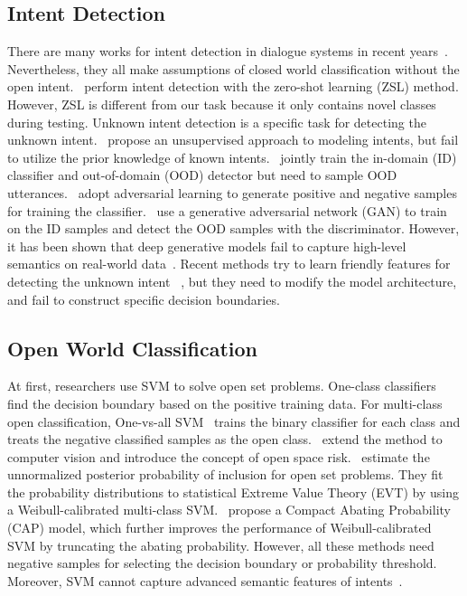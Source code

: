 \documentclass[letterpaper]{article} %
\begin{document}
\subsection{Intent Detection}
There are many works for intent detection in dialogue systems in recent years~\cite{ijcai2020-532,Qin_Che_Li_Ni_Liu_2020,zhang-etal-2019-joint,e-etal-2019-novel,qin-etal-2019-stack}. Nevertheless, they all make assumptions of closed world classification without the open intent.~\citet{srivastava-etal-2018-zero} perform intent detection with the zero-shot learning (ZSL) method. However, ZSL is different from our task because it only contains novel classes during testing.  Unknown intent detection is a specific task for detecting the unknown intent.~\citet{Brychcin2017UnsupervisedDA} propose an unsupervised approach to modeling intents,  but fail to utilize the prior knowledge of known intents.~\citet{Kim2018JointLO} jointly train the in-domain (ID) classifier and out-of-domain (OOD) detector but need to sample OOD utterances.~\citet{Yu2017OpenCategoryCB} adopt adversarial learning to generate positive and negative samples for training the classifier.~\citet{ryu-etal-2018-domain} use a generative adversarial network (GAN) to train on the ID samples and detect the OOD samples with the discriminator. However, it has been shown that deep generative models fail to capture high-level semantics on real-world data~\cite{2018arXiv181009136N,Mundt_2019_ICCV}. Recent methods try to learn friendly features for detecting the unknown intent ~\cite{lin-xu-2019-deep,gangal2020likelihood,yan-etal-2020-unknown}, but they need to modify the  model architecture, and fail to construct specific decision boundaries.

\subsection{Open World Classification}
At first, researchers use SVM to solve open set problems. One-class classifiers~\cite{scholkopf2001estimating,SVDD} find the decision boundary based on the positive training data. For multi-class open classification, One-vs-all SVM~\cite{Rifkin2004In} trains the binary classifier for each class and treats the negative classified samples as the open class.~\citet{scheirer2013toward} extend the method to computer vision and introduce the concept of open space risk.~\citet{Jain_2014_ECCV} estimate the unnormalized posterior probability of inclusion for open set problems. They fit the probability distributions to statistical Extreme Value Theory (EVT) by using a Weibull-calibrated multi-class SVM.~\citet{Scheirer_2014_TPAMIb} propose a Compact Abating Probability (CAP) model, which further improves the performance of Weibull-calibrated SVM by truncating the abating probability. However, all these methods need negative samples for selecting the decision boundary or probability threshold. Moreover, SVM cannot capture  advanced semantic features of intents~\cite{lin2019post}.
\end{document}
